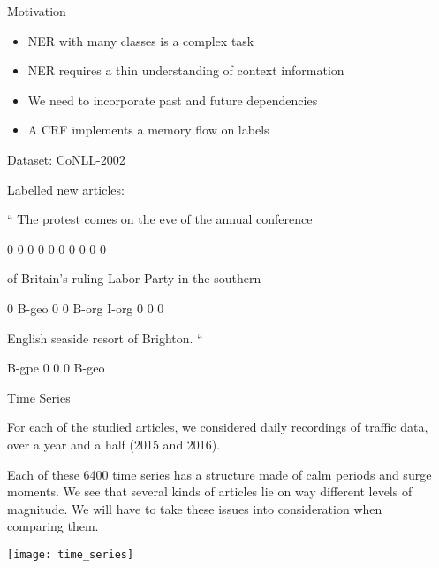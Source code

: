 \documentclass[final]{beamer}
\newlength{\sepwid}
\newlength{\onecolwid}
\begin{document}
\begin{frame}[t]
\begin{columns}[t]
\begin{column}{\onecolwid}
\begin{block}{Motivation}
    \begin{itemize}
      \item NER with many classes is a complex task
      \item NER requires a thin understanding of context information
      \item We need to incorporate past and future dependencies
      \item A CRF implements a memory flow on labels
    \end{itemize}

\end{block}

\begin{block}{Dataset: CoNLL-2002}

Labelled new articles:

`` The protest comes on the eve of the annual conference

0 0 0 0 0 0 0 0 0 0

of Britain's ruling Labor Party in the southern

0 B-geo 0 0 B-org I-org 0 0 0

English seaside resort of Brighton. ``

B-gpe 0 0 0 B-geo
\end{block}

\begin{block}{Time Series}

For each of the studied articles, we considered daily recordings of traffic data, over a year and a half (2015 and 2016).

\vspace{5mm}

Each of these 6400 time series has a structure made of calm periods and surge moments. We see that several kinds of articles lie on way different levels of magnitude. We will have to take these issues into consideration when comparing them.

\begin{center}
  \texttt{[image: time\_series]}
\end{center}

\end{block}


\end{column} %

\begin{column}{\sepwid}\end{column} %


\end{columns}
\end{frame}
\end{document}
